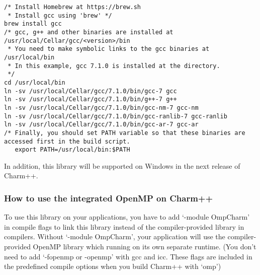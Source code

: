 \begin{verbatim}
/* Install Homebrew at https://brew.sh
 * Install gcc using 'brew' */
brew install gcc
/* gcc, g++ and other binaries are installed at /usr/local/Cellar/gcc/<version>/bin
 * You need to make symbolic links to the gcc binaries at /usr/local/bin
 * In this example, gcc 7.1.0 is installed at the directory.
 */
cd /usr/local/bin
ln -sv /usr/local/Cellar/gcc/7.1.0/bin/gcc-7 gcc
ln -sv /usr/local/Cellar/gcc/7.1.0/bin/g++-7 g++
ln -sv /usr/local/Cellar/gcc/7.1.0/bin/gcc-nm-7 gcc-nm
ln -sv /usr/local/Cellar/gcc/7.1.0/bin/gcc-ranlib-7 gcc-ranlib
ln -sv /usr/local/Cellar/gcc/7.1.0/bin/gcc-ar-7 gcc-ar
/* Finally, you should set PATH variable so that these binaries are accessed first in the build script.
   export PATH=/usr/local/bin:$PATH
\end{verbatim}

In addition, this library will be supported on Windows in the next release of Charm++.

\subsubsection{How to use the integrated OpenMP on Charm++}

To use this library on your applications, you have to add `-module OmpCharm' in compile flags 
to link this library instead of the compiler-provided library in compilers. Without `-module OmpCharm', 
your application will use the compiler-provided OpenMP library which running on its own separate runtime. 
(You don't need to add `-fopenmp or -openmp' with gcc and icc. These flags are included 
in the predefined compile options when you build Charm++ with `omp')


